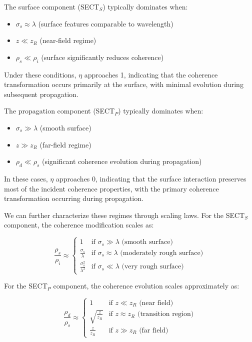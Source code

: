 \documentclass[a4paper,12pt]{article}
\begin{document}
The surface component (SECT$_S$) typically dominates when:
\begin{itemize}
\item $\sigma_s \approx \lambda$ (surface features comparable to wavelength)
\item $z \ll z_R$ (near-field regime)
\item $\rho_s \ll \rho_i$ (surface significantly reduces coherence)
\end{itemize}

Under these conditions, $\eta$ approaches 1, indicating that the coherence transformation occurs primarily at the surface, with minimal evolution during subsequent propagation.

The propagation component (SECT$_P$) typically dominates when:
\begin{itemize}
\item $\sigma_s \gg \lambda$ (smooth surface)
\item $z \gg z_R$ (far-field regime)
\item $\rho_d \ll \rho_s$ (significant coherence evolution during propagation)
\end{itemize}

In these cases, $\eta$ approaches 0, indicating that the surface interaction preserves most of the incident coherence properties, with the primary coherence transformation occurring during propagation.

We can further characterize these regimes through scaling laws. For the SECT$_S$ component, the coherence modification scales as:

\begin{equation}
\frac{\rho_s}{\rho_i} \approx \begin{cases}
1 & \text{if } \sigma_s \gg \lambda \text{ (smooth surface)} \\
\frac{\sigma_s}{\lambda} & \text{if } \sigma_s \approx \lambda \text{ (moderately rough surface)} \\
\frac{\sigma_s^2}{\lambda^2} & \text{if } \sigma_s \ll \lambda \text{ (very rough surface)}
\end{cases}
\end{equation}

For the SECT$_P$ component, the coherence evolution scales approximately as:

\begin{equation}
\frac{\rho_d}{\rho_s} \approx \begin{cases}
1 & \text{if } z \ll z_R \text{ (near field)} \\
\sqrt{\frac{z}{z_R}} & \text{if } z \approx z_R \text{ (transition region)} \\
\frac{z}{z_R} & \text{if } z \gg z_R \text{ (far field)}
\end{cases}
\end{equation}
\end{document}
